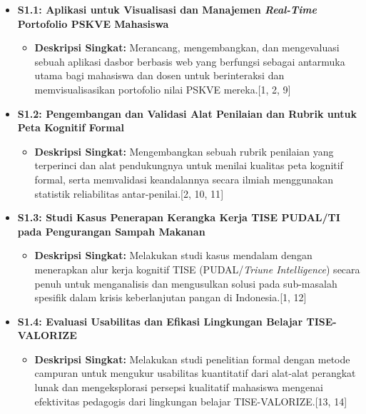 \documentclass[
  letterpaper,
  DIV=11,
  numbers=noendperiod]{scrreprt}
\providecommand{\tightlist}{%
  \setlength{\itemsep}{0pt}\setlength{\parskip}{0pt}}
\begin{document}
\begin{itemize}
\tightlist
\item
  \textbf{S1.1: Aplikasi untuk Visualisasi dan Manajemen
  \emph{Real-Time} Portofolio PSKVE Mahasiswa}

  \begin{itemize}
  \tightlist
  \item
    \textbf{Deskripsi Singkat:} Merancang, mengembangkan, dan
    mengevaluasi sebuah aplikasi dasbor berbasis web yang berfungsi
    sebagai antarmuka utama bagi mahasiswa dan dosen untuk berinteraksi
    dan memvisualisasikan portofolio nilai PSKVE mereka.{[}1, 2, 9{]}
  \end{itemize}
\item
  \textbf{S1.2: Pengembangan dan Validasi Alat Penilaian dan Rubrik
  untuk Peta Kognitif Formal}

  \begin{itemize}
  \tightlist
  \item
    \textbf{Deskripsi Singkat:} Mengembangkan sebuah rubrik penilaian
    yang terperinci dan alat pendukungnya untuk menilai kualitas peta
    kognitif formal, serta memvalidasi keandalannya secara ilmiah
    menggunakan statistik reliabilitas antar-penilai.{[}2, 10, 11{]}
  \end{itemize}
\item
  \textbf{S1.3: Studi Kasus Penerapan Kerangka Kerja TISE PUDAL/TI pada
  Pengurangan Sampah Makanan}

  \begin{itemize}
  \tightlist
  \item
    \textbf{Deskripsi Singkat:} Melakukan studi kasus mendalam dengan
    menerapkan alur kerja kognitif TISE (PUDAL/\emph{Triune
    Intelligence}) secara penuh untuk menganalisis dan mengusulkan
    solusi pada sub-masalah spesifik dalam krisis keberlanjutan pangan
    di Indonesia.{[}1, 12{]}
  \end{itemize}
\item
  \textbf{S1.4: Evaluasi Usabilitas dan Efikasi Lingkungan Belajar
  TISE-VALORIZE}

  \begin{itemize}
  \tightlist
  \item
    \textbf{Deskripsi Singkat:} Melakukan studi penelitian formal dengan
    metode campuran untuk mengukur usabilitas kuantitatif dari alat-alat
    perangkat lunak dan mengeksplorasi persepsi kualitatif mahasiswa
    mengenai efektivitas pedagogis dari lingkungan belajar
    TISE-VALORIZE.{[}13, 14{]}
  \end{itemize}
\end{itemize}
\end{document}
